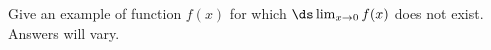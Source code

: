 {Give an example of function $f(x)$ for which $\ds \lim_{x\to 0} f(x)$ does not exist.}
{Answers will vary.}
